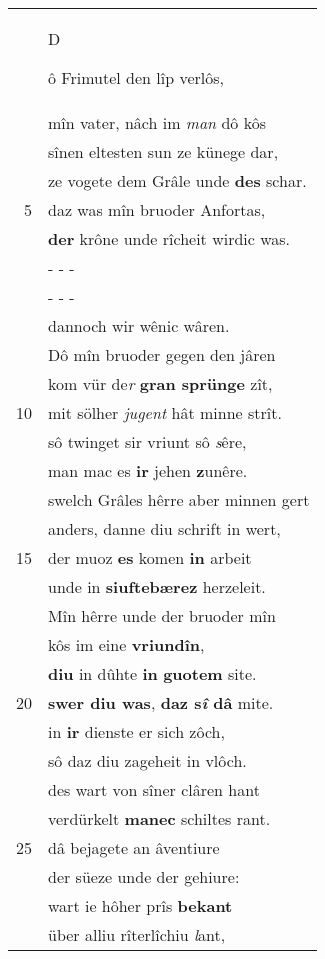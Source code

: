 \documentclass[8pt,a4paper,notitlepage]{article}
\begin{document}
\begin{table}[ht]
\begin{minipage}[t]{0.5\linewidth}
\begin{tabular}{rl}
 & \begin{large}D\end{large}ô Frimutel den lîp verlôs,\\ 
 & mîn vater, nâch im \textit{man} dô kôs\\ 
 & sînen eltesten sun ze künege dar,\\ 
 & ze vogete dem Grâle unde \textbf{des} schar.\\ 
5 & daz was mîn bruoder Anfortas,\\ 
 & \textbf{der} krône unde rîcheit wirdic was.\\ 
 & \multicolumn{1}{l}{ - - - }\\ 
 & \multicolumn{1}{l}{ - - - }\\ 
 & dannoch wir wênic wâren.\\ 
 & Dô mîn bruoder gegen den jâren\\ 
 & kom vür de\textit{r} \textbf{gran sprünge} zît,\\ 
10 & mit sölher \textit{jugent} hât minne strît.\\ 
 & sô twinget sir vriunt sô \textit{s}êre,\\ 
 & man mac es \textbf{ir} jehen \textbf{z}unêre.\\ 
 & swelch Grâles hêrre aber minnen gert\\ 
 & anders, danne diu schrift in wert,\\ 
15 & der muoz \textbf{es} komen \textbf{in} arbeit\\ 
 & unde in \textbf{siuftebærez} herzeleit.\\ 
 & Mîn hêrre unde der bruoder mîn\\ 
 & kôs im eine \textbf{vriundîn},\\ 
 & \textbf{diu} in dûhte \textbf{in} \textbf{guotem} site.\\ 
20 & \textbf{swer diu was}, \textbf{daz s\textit{î} dâ} mite.\\ 
 & in \textbf{ir} dienste er sich zôch,\\ 
 & sô daz diu zageheit in vlôch.\\ 
 & des wart von sîner clâren hant\\ 
 & verdürkelt \textbf{manec} schiltes rant.\\ 
25 & dâ bejagete an âventiure\\ 
 & der süeze unde der gehiure:\\ 
 & wart ie hôher prîs \textbf{bekant}\\ 
 & über alliu rîterlîchiu \textit{l}ant,\\ 

\end{tabular}
\end{minipage}
\end{table}
\end{document}
